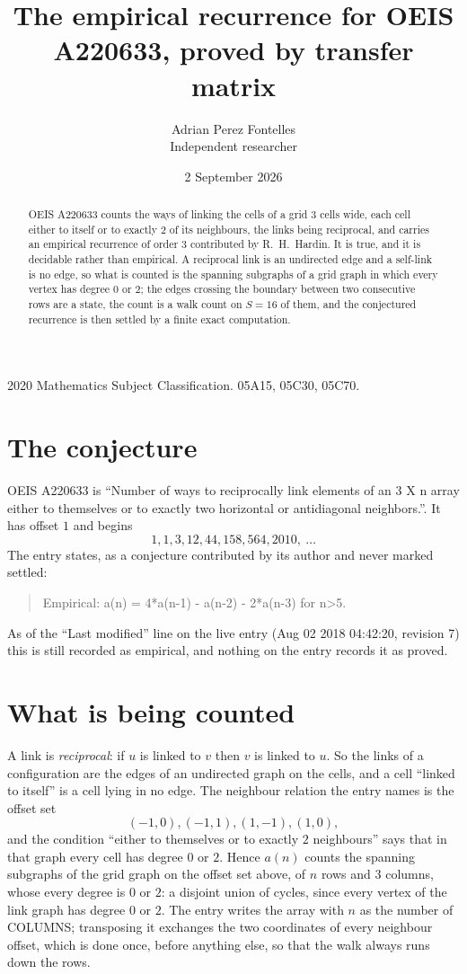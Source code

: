 \documentclass[11pt,a4paper]{article}
\title{The empirical recurrence for OEIS A220633, proved by transfer matrix}
\author{Adrian Perez Fontelles\\ \small Independent researcher}
\date{2 September 2026}
\theoremstyle{plain}
\theoremstyle{definition}
\begin{document}
\maketitle

\begin{abstract}
OEIS A220633 counts the ways of linking the cells of a grid $3$ cells wide, each cell either to
itself or to exactly $2$ of its neighbours, the links being reciprocal, and carries an
empirical recurrence of order $3$ contributed by R.~H.~Hardin. It is true, and it is
decidable rather than empirical. A reciprocal link is an undirected edge and a self-link is
no edge, so what is counted is the spanning subgraphs of a grid graph in which every vertex
has degree $0$ or $2$; the edges crossing the boundary between two consecutive rows are a
state, the count is a walk count on $S=16$ of them, and the conjectured recurrence is then
settled by a finite exact computation.
\end{abstract}

\noindent\small 2020 Mathematics Subject Classification. 05A15, 05C30, 05C70.\normalsize

\section{The conjecture}

OEIS A220633 is ``Number of ways to reciprocally link elements of an 3 X n array either to themselves or to exactly two horizontal or antidiagonal neighbors.''. It has offset $1$ and begins
\[
1, 1, 3, 12, 44, 158, 564, 2010,\ \dots
\]
The entry states, as a conjecture contributed by its author and never marked settled:
\begin{quote}
Empirical: a(n) = 4*a(n-1) - a(n-2) - 2*a(n-3) for n>5.
\end{quote}
As of the ``Last modified'' line on the live entry (Aug 02 2018 04:42:20, revision 7) this is still
recorded as empirical, and nothing on the entry records it as proved.

\section{What is being counted}

A link is \emph{reciprocal}: if $u$ is linked to $v$ then $v$ is linked to $u$. So the links
of a configuration are the edges of an undirected graph on the cells, and a cell ``linked to
itself'' is a cell lying in no edge. The neighbour relation the entry names is the offset set
\[
(-1,0), (-1,1), (1,-1), (1,0),
\]
and the condition ``either to themselves or to exactly $2$ neighbours'' says that in that
graph every cell has degree $0$ or $2$. Hence $a(n)$ counts the spanning subgraphs of the
grid graph on the offset set above, of $n$ rows and $3$ columns,
whose every degree is $0$ or $2$: a disjoint union of cycles, since every vertex of the link graph has degree $0$ or $2$. The entry writes the array with $n$ as the number of COLUMNS; transposing it exchanges the two coordinates of every neighbour offset, which is done once, before anything else, so that the walk always runs down the rows.
\end{document}
